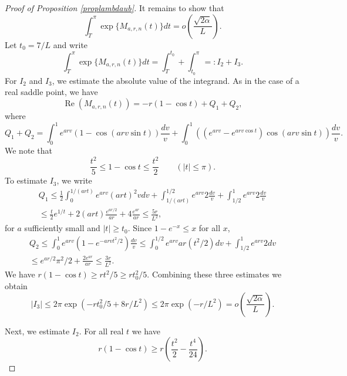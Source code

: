 \documentclass[11pt]{amsart}
\DeclareMathOperator{\re}{Re}
\begin{document}
\begin{proof}[Proof of Proposition \ref{proplambdaub}]
It remains to show that 
$$
 \int_{T}^{\pi} \exp\{ M_{a,r,n}(t) \} dt = o\left(\frac{\sqrt{2\alpha}}{L} \right).
$$
Let $t_0 = 7/L$ and write
$$
 \int_{T}^{\pi} \exp\{ M_{a,r,n}(t) \} dt = \int_{T}^{t_0} + \int_{t_0}^{\pi} =: I_2 +I_3.
$$
For $I_2$ and $I_3$, we estimate the absolute value of the integrand. As in the case of a real saddle point,  we have
$$
\re(M_{a,r,n}(t)) = -r(1-\cos t ) + Q_1+Q_2,
$$
where
\begin{equation*}
Q_1+Q_2 =  \int_0^1 e^{arv}(1-\cos(arv \sin t) ) \frac{dv}{v} +  \int_0^1 ((e^{arv}-e^{arv \cos t })\cos(arv \sin t) ) \frac{dv}{v}.
\end{equation*}
We note that 
$$\frac{t^2}{5} \le 1-\cos t \le  \frac{t^2}{2}\qquad (|t| \le \pi).
$$ 
To estimate $I_3$, we write
\begin{multline*}
Q_1 \le \frac{1}{2}\int_0^{1/(ar t)} e^{arv}( a r  t)^2 v dv +  \int_{1/(ar t)}^{1/2} e^{arv} 2 \frac{dv}{v} + \int_{1/2}^1 e^{arv} 2 \frac{dv}{v}\\
\le \frac{t}{2}e^{1/t} + 2 (ar t) \frac{e^{ar/2}}{ar} + 4 \frac{e^{ar}}{ar}  \le  \frac{5r}{L^2},
\end{multline*}
for $a$ sufficiently small and $|t|\ge t_0$.
Since $1-e^{-x} \le x$ for all $x$, 
\begin{multline*}
Q_2 \le \int_0^{1} e^{arv}( 1-e^{-arv t^2/2}) \frac{dv}{v}\le \int_0^{1/2} e^{arv} ar (t^2/2) dv +  \int_{1/2}^1  e^{arv} 2 dv \\
\le e^{ar/2}\pi^2/2 + \frac{2 e^{ar}}{ar} \le \frac{3r}{L^2}.
\end{multline*}
We have $r(1-\cos t) \ge r t^2/5 \ge r t_0^2/5$. Combining these three estimates we obtain
$$
|I_3| \le 2\pi \exp( - rt_0^2/5 +8r/L^2) \le 2\pi \exp(-r/L^2)= o\left(\frac{\sqrt{2\alpha}}{L} \right).
$$

Next, we estimate $I_2$. For all real $t$ we have
$$
 r(1-\cos t) \ge r \left(\frac{ t^2}{2}-\frac{t^4}{24}\right).
$$


\end{proof}
\end{document}
